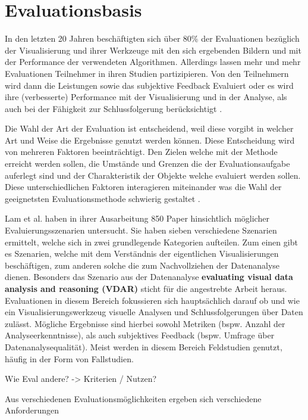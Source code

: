 \documentclass[draft=false
              ,paper=a4
              ,twoside=false
              ,fontsize=11pt
              ,headsepline
              ,BCOR10mm
              ,DIV11
              ]{scrbook}
\begin{document}
\chapter{Evaluationsbasis} %
\label{cha:evaluationsbasis}
In den letzten 20 Jahren beschäftigten sich über 80\% der Evaluationen bezüglich der Visualisierung und ihrer Werkzeuge mit den sich ergebenden Bildern und mit der Performance der verwendeten Algorithmen. Allerdings lassen mehr und mehr Evaluationen Teilnehmer in ihren Studien partizipieren. Von den Teilnehmern wird dann die Leistungen sowie das subjektive Feedback Evaluiert oder es wird ihre (verbesserte) Performance mit der Visualisierung und in der Analyse, als auch bei der Fähigkeit zur Schlussfolgerung berücksichtigt \cite{isenberg_systematic_2013}. 

Die Wahl der Art der Evaluation ist entscheidend, weil diese vorgibt in welcher Art und Weise die Ergebnisse genutzt werden können. Diese Entscheidung wird von mehreren Faktoren beeinträchtigt. Den Zielen welche mit der Methode erreicht werden sollen, die Umstände und Grenzen die der Evaluationsaufgabe auferlegt sind und der Charakteristik der Objekte welche evaluiert werden sollen. Diese unterschiedlichen Faktoren interagieren miteinander was die Wahl der geeignetsten Evaluationsmethode schwierig gestaltet \cite{kitchenham_evaluating_1996-2}.

Lam et al. haben in ihrer Ausarbeitung \cite{lam_empirical_2012} 850 Paper hinsichtlich möglicher Evaluierungsszenarien untersucht. Sie haben sieben verschiedene Szenarien ermittelt, welche sich in zwei grundlegende Kategorien aufteilen. Zum einen gibt es Szenarien, welche mit dem Verständnis der eigentlichen Visualisierungen beschäftigen, zum anderen solche die zum Nachvollziehen der Datenanalyse dienen. Besonders das Szenario aus der Datenanalyse \textbf{evaluating visual data analysis and reasoning (VDAR)} sticht für die angestrebte Arbeit heraus. Evaluationen in diesem Bereich fokussieren sich hauptsächlich darauf ob und wie ein Visualisierungswerkzeug visuelle Analysen und Schlussfolgerungen über Daten zulässt. Mögliche Ergebnisse sind hierbei sowohl Metriken (bspw. Anzahl der Analyseerkenntnisse), als auch subjektives Feedback (bspw. Umfrage über Datenanalysequalität). Meist werden in diesem Bereich Feldstudien genutzt, häufig in der Form von Fallstudien.


\iffalse

Wie Eval andere? -> Kriterien / Nutzen?

Aus verschiedenen Evaluationsmöglichkeiten ergeben sich verschiedene Anforderungen
\end{document}
